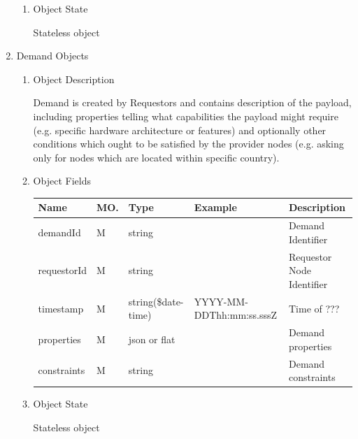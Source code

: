 \begin{enumerate}
\begin{enumerate}
\item Object State

Stateless object

\end{enumerate}

\item Demand Objects

\begin{enumerate}

\item Object Description

Demand is created by Requestors and contains description of the
payload, including properties telling what capabilities the payload might
require (e.g. specific hardware architecture or features) and optionally other
conditions which ought to be satisfied by the provider nodes (e.g. asking only
for nodes which are located within specific country). 


\item Object Fields

\begin{center}
\begin{tabular}{|p{3cm}|l|p{3cm}|p{3cm}|p{4cm}|} 
\hline
\rowcolor{lightgray}	Name	& MO.	& Type	& Example & 	Description \\
\hline

demandId 	& M & string  & 		& Demand Identifier \\
\hline 		

requestorId & M & string  & 		& Requestor Node Identifier \\
\hline

timestamp	& M	& 	string(\$date-time)	& YYYY-MM-DDThh:mm:ss.sssZ	&	Time of ???  \\
\hline

properties	& M	& 	json or flat	&		&	Demand properties \\ 
\hline

constraints	& M	& 	string	&		&	Demand constraints \\ 
\hline

\end{tabular}
\end{center}


\item Object State

Stateless object

\end{enumerate}


\end{enumerate}

